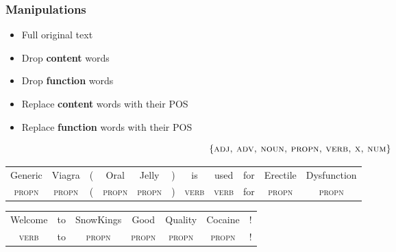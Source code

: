 \documentclass[t,xcolor={svgnames,table}]{beamer}
\begin{document}
\begin{frame}
	\frametitle{Manipulations}
	
	\begin{itemize}\setlength\itemsep{1em}
	    \item Full original text
	\end{itemize}
	\vfill
	
	\begin{minipage}{.35\textwidth}
	\begin{itemize}\setlength\itemsep{1em}
		\item Drop \textbf{content} words
		\item Drop \textbf{function} words
	\end{itemize}
	\end{minipage}
	\begin{minipage}{.59\textwidth}
	\begin{itemize}\setlength\itemsep{1em}
		\item Replace \textbf{content} words with their POS
		\item Replace \textbf{function} words with their POS
	\end{itemize}
	\end{minipage}
	\vfill
	
    \[\{\textsc{adj, adv, noun, propn, verb, x, num}\}\]
	\vfill
	\pause
	
	{\color{green}
	\setlength{\tabcolsep}{2.3pt}
	\begin{tabular}{ccccccccccc}
	Generic&Viagra&(&Oral&Jelly&)&is&used&for&Erectile&Dysfunction\\
	\small\textsc{propn} & \small\textsc{propn} &(& \small\textsc{propn} & \small\textsc{propn} &)& \small\textsc{verb} & \small\textsc{verb} & for & \small\textsc{propn} & \small\textsc{propn}
	\end{tabular}}
	\vfill
	\pause
	
	{\color{red}
	\setlength{\tabcolsep}{9.5pt}
	\begin{tabular}{ccccccc}
	Welcome&to&SnowKings&Good&Quality&Cocaine&!\\
	\small\textsc{verb} & to & \small\textsc{propn} & \small\textsc{propn} & \small\textsc{propn} & \small\textsc{propn} & !
	\end{tabular}}
\end{frame}
\end{document}
